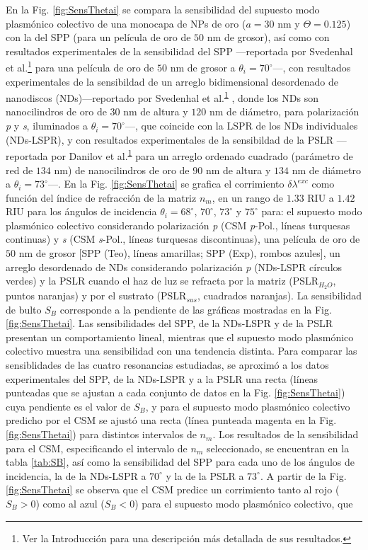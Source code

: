 En la Fig. \ref{fig:SensThetai} se compara la sensibilidad del supuesto modo  plasmónico colectivo de una monocapa de NPs de oro ($a=30$ nm y $\Theta=0.125$) con la del SPP (para un película de oro de $50$ nm de grosor), así como con resultados experimentales de la sensibilidad del SPP ---reportada por  Svedenhal et al.\footnote{\label{fn:Motivacion}Ver la Introducción para una descripción más detallada de sus resultados.} \cite{svedendahl2009refractometric} para una película de oro de $50$ nm de grosor a $\theta_i = 70^\circ$---, con resultados experimentales de la sensibildad de un  arreglo bidimensional desordenado de nanodiscos (NDs)---reportado por Svedenhal et al.\textsuperscript{\ref{fn:Motivacion}}  \cite{svedendahl2009refractometric}, donde los NDs son nanocilindros de oro de $30$ nm de altura y $120$ nm de diámetro, para polarización \emph{p} y \emph{s}, iluminados a $\theta_i = 70^\circ$---, que coincide con la LSPR de los NDs individuales (NDs-LSPR), y con resultados experimentales de la sensibildad de la PSLR ---reportada por Danilov et al.\textsuperscript{\ref{fn:Motivacion}} \cite{danilov2018ultra} para un arreglo ordenado cuadrado (parámetro de red de $134$ nm) de nanocilindros de oro de $90$ nm de altura y $134$ nm de diámetro a $\theta_i= 73^\circ$---. En la Fig. \ref{fig:SensThetai} se grafica el corrimiento $\delta\lambda^{exc}$ como función del índice de refracción de la matriz $n_m$, en un rango de $1.33$ RIU a $1.42$ RIU para los ángulos de incidencia $\theta_i = 68^\circ$, $70^\circ$, $73^\circ$ y $75^\circ$ para: el supuesto modo  plasmónico colectivo considerando polarización \emph{p} (CSM \textit{p}-Pol., líneas turquesas continuas) y \emph{s} (CSM \textit{s}-Pol., líneas turquesas discontinuas), una película de oro de $50$ nm de grosor [SPP (Teo), líneas amarillas; SPP (Exp), rombos azules], un arreglo desordenado de NDs  considerando polarización \emph{p} (NDs-LSPR círculos verdes) y la PSLR cuando el haz de luz se refracta por la matriz (PSLR$_{H_{2}O}$, puntos naranjas) y por el sustrato (PSLR$_{sus}$, cuadrados naranjas). La sensibilidad de bulto $S_B$ corresponde a la pendiente de las gráficas mostradas en la Fig. \ref{fig:SensThetai}. Las sensibilidades del SPP, de la NDs-LSPR y de la PSLR presentan un comportamiento lineal, mientras que el supuesto modo  plasmónico colectivo muestra una sensibilidad con una tendencia distinta. Para comparar las sensiblidades de las cuatro resonancias estudiadas, se aproximó a los datos experimentales del SPP, de la NDs-LSPR y a la PSLR una recta (líneas punteadas que se ajustan a cada conjunto de datos en la Fig. \ref{fig:SensThetai}) cuya pendiente es el valor de $S_B$, y para el supuesto modo  plasmónico colectivo predicho por el CSM se ajustó una recta (línea punteada magenta en la Fig. \ref{fig:SensThetai}) para distintos intervalos de $n_m$. Los resultados de la sensibilidad para el CSM, especificando el  intervalo de $n_m$ seleccionado, se  encuentran en la tabla \ref{tab:SB}, así como la sensibilidad del SPP para cada uno de los ángulos de incidencia, la de la NDs-LSPR a $70^\circ$ y la de la PSLR a $73^\circ$. A partir de la Fig. \ref{fig:SensThetai} se observa que el  CSM predice un corrimiento tanto al  rojo ($S_B>0$) como al azul ($S_B<0$) para el supuesto modo plasmónico colectivo, que 